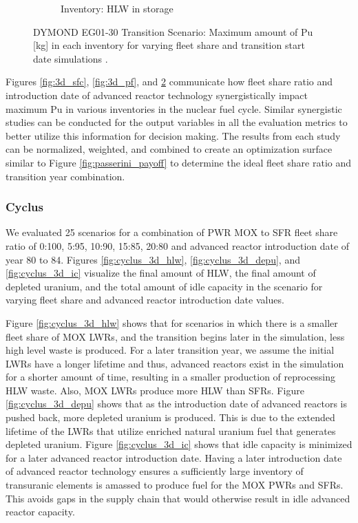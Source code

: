 \begin{figure}[]
\begin{subfigure}[t]{0.58\textwidth}
        \caption{Inventory: HLW in storage}
        \label{fig:3d_hlw}
    \end{subfigure}
    \caption{DYMOND EG01-30 Transition Scenario: Maximum amount of Pu [kg] in each inventory for varying fleet share and transition start date simulations \cite{chee_gwenchee/ddwrapper_2019}.}
\end{figure}

Figures \ref{fig:3d_sfc}, \ref{fig:3d_pf}, and \ref{fig:3d_hlw}
communicate how fleet share ratio and introduction date of advanced 
reactor technology 
synergistically impact maximum Pu in various inventories in the 
nuclear fuel cycle. 
Similar synergistic studies can be conducted for the output variables in 
all the evaluation metrics to better utilize this information for decision making. 
The results from each study can be normalized, weighted, and 
combined to create an optimization surface similar 
to Figure \ref{fig:passerini_payoff} to determine the ideal fleet share 
ratio and transition year combination. 

\subsubsection{\textbf{Cyclus}}
We evaluated 25 scenarios for a combination of PWR MOX to SFR fleet share ratio 
of 0:100, 5:95, 10:90, 15:85, 20:80 and advanced reactor introduction 
date of year 80 to 84.
Figures \ref{fig:cyclus_3d_hlw}, \ref{fig:cyclus_3d_depu}, and 
\ref{fig:cyclus_3d_ic}
visualize the final amount of HLW, the final amount of depleted uranium, 
and the total amount of idle capacity in the scenario for varying 
fleet share and advanced reactor introduction date values. 

Figure \ref{fig:cyclus_3d_hlw} shows that for scenarios in which 
there is a smaller fleet share of \gls{MOX} \glspl{LWR}, and the 
transition begins later in the simulation, less high 
level waste is produced. 
For a later transition year, we assume the initial 
\glspl{LWR} have a longer lifetime
and thus, advanced reactors exist in the simulation for a shorter 
amount of time, resulting in a smaller production of reprocessing 
HLW waste. 
Also, \gls{MOX} \glspl{LWR} produce more \gls{HLW} than \glspl{SFR}. 
Figure \ref{fig:cyclus_3d_depu} shows that as the introduction date 
of advanced reactors is pushed back, more depleted uranium is produced. 
This is due to the extended lifetime of the \glspl{LWR} that utilize enriched 
natural uranium fuel that generates depleted uranium. 
Figure \ref{fig:cyclus_3d_ic} shows that idle capacity is minimized 
for a later advanced reactor introduction date. 
Having a later introduction date of advanced reactor technology ensures 
a sufficiently large inventory of transuranic elements is amassed
to produce fuel for the \gls{MOX} \glspl{PWR} and \glspl{SFR}.  
This avoids gaps in the supply chain that would otherwise result in 
idle advanced reactor capacity. 

